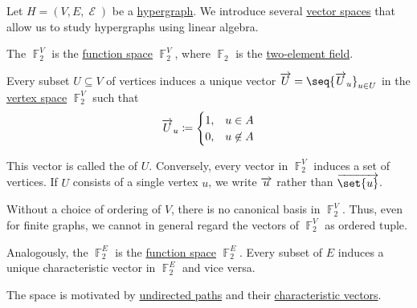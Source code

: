 \begin{definition}\label{def:hypergraph_vector_spaces}
  Let \( H = (V, E, \mscrE) \) be a \hyperref[def:hypergraph]{hypergraph}. We introduce several \hyperref[def:vector_space]{vector spaces} that allow us to study hypergraphs using linear algebra.

  \begin{thmenum}
     The  \( \BbbF_2^V \) is the \hyperref[thm:functions_over_algebra]{function space} \( \BbbF_2^V \), where \( \BbbF_2 \) is the \hyperref[thm:finite_fields]{two-element field}.

    Every subset \( U \subseteq V \) of vertices induces a unique vector \( \vect{U} = \seq{ \vect{U}_u }_{u \in U} \) in the \hyperref[def:hypergraph_vector_spaces/vertex]{vertex space} \( \BbbF_2^V \) such that
    \begin{equation*}
      \overrightarrow{U}_u \coloneqq \begin{cases}
        1, &u \in A \\
        0, &u \not\in A
      \end{cases}
    \end{equation*}

    This vector is called the  of \( U \). Conversely, every vector in \( \BbbF_2^V \) induces a set of vertices. If \( U \) consists of a single vertex \( u \), we write \( \overrightarrow{u} \) rather than \( \vect{\set{u}} \).

    Without a choice of ordering of \( V \), there is no canonical basis in \( \BbbF_2^V \). Thus, even for finite graphs, we cannot in general regard the vectors of \( \BbbF_2^V \) as ordered tuple.

     Analogously, the  \( \BbbF_2^E \) is the \hyperref[thm:functions_over_algebra]{function space} \( \BbbF_2^E \). Every subset of \( E \) induces a unique characteristic vector in \( \BbbF_2^E \) and vice versa.

    The space is motivated by \hyperref[def:undirected_multigraph_path]{undirected paths} and their \hyperref[def:undirected_multigraph_path/characteristic_vector]{characteristic vectors}.
  \end{thmenum}
\end{definition}

